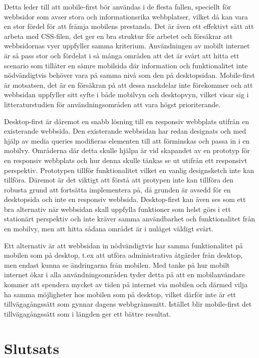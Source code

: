 \documentclass[11pt]{article}
\begin{document}
Detta leder till att mobile-first bör användas i de flesta fallen, speciellt för webbsidor som avser stora och informationsrika webbplatser, vilket då kan vara en stor fördel för att främja mobilens prestanda. Det är även ett effektivt sätt att arbeta med CSS-filen, det ger en bra struktur för arbetet och försäkrar att webbsidornas vyer uppfyller samma kriterium. Användningen av mobilt internet är så pass stor och fördelat i så många områden att det är svårt att hitta ett scenario som tillåter en sämre mobilsida där information och funktionalitet inte nödvändigtvis behöver vara på samma nivå som den på desktopsidan. Mobile-first är motsatsen, det är en försäkran på att dessa nackdelar inte förekommer och att webbsidan uppfyller sitt syfte i både mobilvyn och desktopvyn, vilket visar sig i litteraturstudien för användningsområden att vara högst prioriterande. 

Desktop-first är däremot en snabb lösning till en responsiv webbplats utifrån en existerande webbsida. Den existerande webbsidan har redan designats och med hjälp av media queries modifieras elementen till att förminskas och passa in i en mobilvy. Områderna där detta skulle hjälpa är vid skapandet av en prototyp för en responsiv webbplats och hur denna skulle tänkas se ut utifrån ett responsivt perspektiv. Prototypen tillför funktionalitet vilket en vanlig designsketch inte kan tillföra. Däremot är det viktigt att förstå att protypen inte kan tillföra den robusta grund att fortsätta implementera på, då grunden är avsedd för en desktopsida och inte en responsiv webbsida. Desktop-first kan även ses som ett bra alternativ när webbsidan skall uppfylla funktioner som helst görs i ett stationärt perspektiv och inte kräver samma användbarhet och funktionalitet från en mobilvy, men att hitta sådana området är i nuläget väldigt svårt. 

Ett alternativ är att webbsidan in nödvändigtvis har samma funktionalitet på mobilen som på desktop, t.ex att utföra administrativa åtgärder från desktop, men endast kunna se ändringarna från mobilen. Med tanke på hur mobilt internet ökar i alla användningsområden tyder detta på att en mobilanvändare kommer att spendera mycket av tiden på internet via mobilen och därmed vilja ha samma möjligheter hos mobilen som på desktop, vilket därför inte är ett tillvägagångssätt som gynnar dagens webbgränssnitt. Istället blir mobile-first det tillvägagångssätt som i längden ger ett bättre resultat.

\newpage
\section{Slutsats}
\end{document}
